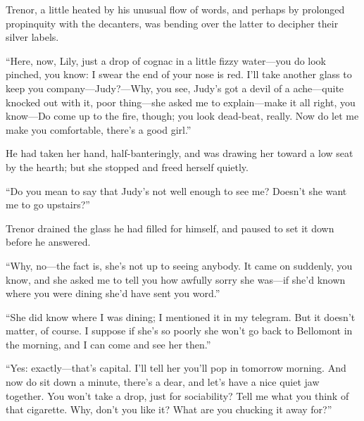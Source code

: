 \documentclass[12pt,a4paper]{book}
\begin{document}
Trenor, a little heated by his unusual flow of words, and
perhaps by prolonged propinquity with the decanters, was bending
over the latter to decipher their silver labels.





``Here, now, Lily, just a drop of cognac in a little fizzy
water---you do look pinched, you know: I swear the end of your
nose is red. I'll take another glass to keep you
company---Judy?---Why, you see, Judy's got a devil of a 
ache---quite knocked out with it, poor thing---she asked me to
explain---make it all right, you know---Do come up to the fire,
though; you look dead-beat, really. Now do let me make you
comfortable, there's a good girl.''





He had taken her hand, half-banteringly, and was drawing her
toward a low seat by the hearth; but she stopped and freed
herself quietly.





``Do you mean to say that Judy's not well enough to see me? 
Doesn't she want me to go upstairs?''





Trenor drained the glass he had filled for himself, and paused to
set it down before he answered.





``Why, no---the fact is, she's not up to seeing anybody. It came on
suddenly, you know, and she asked me to tell you how awfully
sorry she was---if she'd known where you were dining she'd have
sent you word.''





``She did know where I was dining; I mentioned it in my telegram. 
But it doesn't matter, of course. I suppose if she's so poorly
she won't go back to Bellomont in the morning, and I can come and
see her then.''





``Yes: exactly---that's capital. I'll tell her you'll pop in 
tomorrow morning. And now do sit down a minute, there's a dear, and
let's have a nice quiet jaw together. You won't take a drop, just
for sociability? Tell me what you think of that cigarette. Why,
don't you like it? What are you chucking it away for?''
\end{document}
